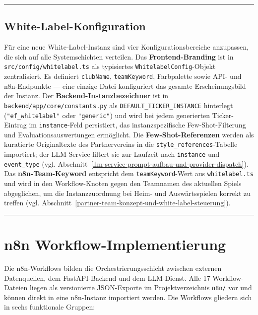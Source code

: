 \begin{center}\rule{0.5\linewidth}{0.5pt}\end{center}

\subsection{White-Label-Konfiguration}\label{white-label-konfiguration-impl}

Für eine neue White-Label-Instanz sind vier Konfigurationsbereiche anzupassen, die sich auf alle Systemschichten verteilen. Das \textbf{Frontend-Branding} ist in \texttt{src/config/whitelabel.ts} als typisiertes \texttt{WhitelabelConfig}-Objekt zentralisiert. Es definiert \texttt{clubName}, \texttt{teamKeyword}, Farbpalette sowie API- und n8n-Endpunkte — eine einzige Datei konfiguriert das gesamte Erscheinungsbild der Instanz. Der \textbf{Backend-Instanzbezeichner} ist in \texttt{backend/app/core/constants.py} als \texttt{DEFAULT\_TICKER\_INSTANCE} hinterlegt (\texttt{"ef\_whitelabel"} oder \texttt{"generic"}) und wird bei jedem generierten Ticker-Eintrag im \texttt{instance}-Feld persistiert, das instanzspezifische Few-Shot-Filterung und Evaluationsauswertungen ermöglicht. Die \textbf{Few-Shot-Referenzen} werden als kuratierte Originaltexte des Partnervereins in die \texttt{style\_references}-Tabelle importiert; der LLM-Service filtert sie zur Laufzeit nach \texttt{instance} und \texttt{event\_type} (vgl. Abschnitt~\ref{llm-service-prompt-aufbau-und-provider-dispatch}). Das \textbf{n8n-Team-Keyword} entspricht dem \texttt{teamKeyword}-Wert aus \texttt{whitelabel.ts} und wird in den Workflow-Knoten gegen den Teamnamen des aktuellen Spiels abgeglichen, um die Instanzzuordnung bei Heim- und Auswärtsspielen korrekt zu treffen (vgl. Abschnitt~\ref{partner-team-konzept-und-white-label-steuerung}).

\begin{center}\rule{0.5\linewidth}{0.5pt}\end{center}

\section{n8n
Workflow-Implementierung}\label{n8n-workflow-implementierung}

Die n8n-Workflows bilden die Orchestrierungsschicht zwischen externen
Datenquellen, dem FastAPI-Backend und dem LLM-Dienst. Alle 17
Workflow-Dateien liegen als versionierte JSON-Exporte im
Projektverzeichnis \texttt{n8n/} vor und können direkt in eine
n8n-Instanz importiert werden. Die Workflows gliedern sich in sechs
funktionale Gruppen:


